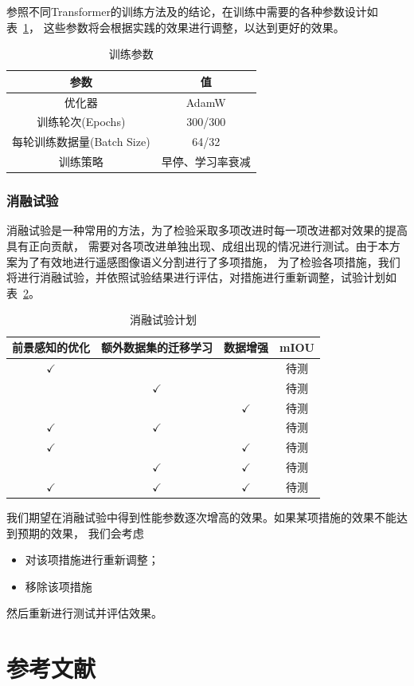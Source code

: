 \documentclass[a4paper,twoside,zihao=5,UTF8]{ctexrep}
\begin{document}
参照不同Transformer的训练方法及\cite{howtotrain}的结论，在训练中需要的各种参数设计如表~\ref{tbl:train}，
这些参数将会根据实践的效果进行调整，以达到更好的效果。

\begin{table}[htbp]
    \centering
    \caption{训练参数}
    \label{tbl:train}
    \renewcommand\arraystretch{1.5}
    \begin{tabular}{c|c}
        \toprule
        \hline
        参数 & 值 \\
        \hline
        优化器 & AdamW \\
        训练轮次(Epochs) & 300/300 \\
        每轮训练数据量(Batch Size) & 64/32 \\
        训练策略 & 早停、学习率衰减 \\
        \hline
        \bottomrule
    \end{tabular}
\end{table}

\section{消融试验}

消融试验是一种常用的方法，为了检验采取多项改进时每一项改进都对效果的提高具有正向贡献，
需要对各项改进单独出现、成组出现的情况进行测试。由于本方案为了有效地进行遥感图像语义分割进行了多项措施，
为了检验各项措施，我们将进行消融试验，并依照试验结果进行评估，对措施进行重新调整，试验计划如表~\ref{tbl:ablexpr}。

\begin{table}[htbp]
    \centering
    \caption{消融试验计划}
    \label{tbl:ablexpr}
    \renewcommand\arraystretch{1.5}
    \begin{tabular}{ccc|c}
        \toprule
        \hline
        前景感知的优化 & 额外数据集的迁移学习 & 数据增强 & mIOU\\
        \hline
        $\checkmark$ & \ & \ & 待测 \\
        \ & $\checkmark$ & \ & 待测  \\
        \ & \ & $\checkmark$ & 待测  \\
        $\checkmark$ & $\checkmark$ & \ & 待测  \\
        $\checkmark$ & \ & $\checkmark$ & 待测  \\
        \ & $\checkmark$ & $\checkmark$ & 待测  \\
        $\checkmark$ & $\checkmark$ & $\checkmark$ & 待测 \\
        \hline
        \bottomrule
    \end{tabular}
\end{table}

我们期望在消融试验中得到性能参数逐次增高的效果。如果某项措施的效果不能达到预期的效果，
我们会考虑
\begin{itemize}
    \item 对该项措施进行重新调整；
    \item 移除该项措施
\end{itemize}
然后重新进行测试并评估效果。

\part*{参考文献}



\end{document}
